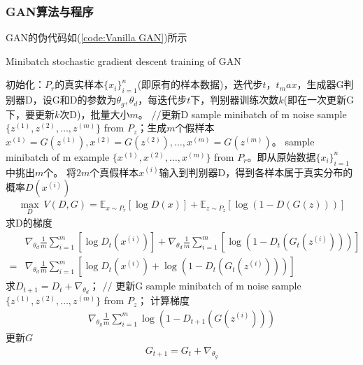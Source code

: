         \subsubsection{GAN算法与程序}
            \par
            GAN的伪代码如(\ref{code:Vanilla GAN})所示
            \begin{algorithm}[htbp]
                \caption{Minibatch stochastic gradient descent training of GAN}\label{code:Vanilla GAN}
                \begin{algorithmic}[1]
                    \State 初始化：$P_r$的真实样本$\{x_i\}_{i=1}^n$(即原有的样本数据)，迭代步$t$，$t_max$，生成器G判别器D，设G和D的参数为$\theta_g,\theta_d$，每迭代步$t$下，判别器训练次数$k$(即在一次更新G下，要更新$k$次D)，批量大小$m$。
                        \State $//$更新D
                            \State sample minibatch of m noise sample $\{z^{(1)},z^{(2)},\dots,z^{(m)}\}$ from $P_z$；生成$m$个假样本$x^{(1)} = G(z^{(1)}),x^{(2)} = G(z^{(2)}),\dots,x^{(m)} = G(z^{(m)})$。
                            \State sample minibatch of m example $\{x^{(1)},x^{(2)},\dots,x^{(m)}\}$ from $P_r$。即从原始数据$\{x_i\}_{i=1}^n$中挑出$m$个。
                            \State 将$2m$个真假样本$x^{(i)}$输入到判别器D，得到各样本属于真实分布的概率$D(x^{(i)})$
                            \begin{align*}
                            \max_D\ V(D,G) = \mathbb{E}_{x\sim P_r}[\log D(x)]+\mathbb{E}_{z\sim P_z}[\log (1-D(G(z)))]
                            \end{align*}
                            \State 求D的梯度
                            \begin{align*}
                            &\nabla _{\theta_d} \frac{1}{m} \sum_{i=1}^m [\log D_t(x^{(i)})]+\nabla_{\theta_d} \frac{1}{m} \sum_{i=1}^m [\log (1-D_t(G_t(z^{(i)})))]\\
                            ={}&\nabla_{\theta_d} \frac{1}{m} \sum_{i=1}^m [\log D_t(x^{(i)})+\log (1-D_t(G_t(z^{(i)})))]
                            \end{align*}
                            \State 求$D_{t+1} = D_t+\nabla_{\theta_d}$；
                        \EndFor
                        \State $//$ 更新G
                        \State sample minibatch of m noise sample $\{z^{(1)},z^{(2)},\dots,z^{(m)}\}$ from $P_z$；
                        \State 计算梯度
                        \begin{align*}
                        \nabla _{\theta_g}\frac{1}{m}\sum_{i=1}^m \log (1-D_{t+1}(G(z^{(i)})))
                        \end{align*}
                        \State 更新$G$
                        \begin{align*}
                        G_{t+1} = G_t + \nabla_{\theta_g}
                        \end{align*}
                    \EndFor
                \end{algorithmic}
            \end{algorithm}
